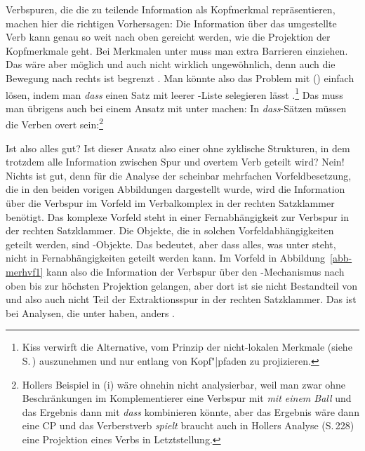 Verbspuren, die die zu teilende Information als Kopfmerkmal repräsentieren, machen hier die
richtigen Vorhersagen: Die Information über das umgestellte Verb kann genau so weit nach oben
gereicht werden, wie die Projektion der Kopfmerkmale geht. Bei Merkmalen unter \nonloc muss man
extra Barrieren einziehen. Das wäre aber möglich und auch nicht wirklich ungewöhnlich, denn auch die
Bewegung nach rechts ist begrenzt \citep[Abschnitt~5.1.2]{Ross67a}. Man könnte also das Problem mit () einfach lösen, indem
man \emph{dass} einen Satz mit leerer \dsl-Liste selegieren lässt \citep[232]{Kiss95b}.\footnote{
Kiss verwirft die Alternative, \dsl vom Prinzip der nicht-lokalen Merkmale (siehe S.\,\pageref{Prinzip-NONLOC}) auszunehmen und nur
entlang von Kopf"|pfaden zu projizieren.
} Das muss man übrigens auch bei
einem Ansatz mit \dsl unter \head machen: In \emph{dass}-Sätzen müssen die Verben overt
sein:\footnote{
Hollers Beispiel \citeyearpar[231]{Holler2005a-u} in (i) wäre ohnehin nicht analysierbar, weil
man zwar ohne Beschränkungen im Komplementierer eine Verbspur mit \emph{mit einem Ball} und das
Ergebnis dann mit \emph{dass} kombinieren könnte, aber das Ergebnis wäre dann eine CP und das
Verberstverb \emph{spielt} braucht auch in Hollers Analyse (S.\,228) eine Projektion eines Verbs in Letztstellung.
\z
}
\z

\noindent
Ist also alles gut? Ist dieser Ansatz also einer ohne zyklische Strukturen, in dem trotzdem alle
Information zwischen Spur und overtem Verb geteilt wird? Nein! Nichts ist gut, denn für die Analyse
der scheinbar mehrfachen Vorfeldbesetzung, die in den beiden vorigen Abbildungen dargestellt wurde,
wird die Information über die Verbspur im Vorfeld im Verbalkomplex in der rechten Satzklammer
benötigt. Das komplexe Vorfeld steht in einer Fernabhängigkeit zur Verbspur in der rechten
Satzklammer. Die Objekte, die in solchen Vorfeldabhängigkeiten geteilt werden, sind
-Objekte. Das bedeutet, aber dass alles, was unter \nonlocal steht, nicht in
Fernabhängigkeiten geteilt werden kann. Im Vorfeld in Abbildung~\ref{abb-merhvf1} kann also die
Information der Verbspur über den \nonlocal-Mechanismus nach oben bis zur höchsten Projektion
gelangen, aber dort ist sie nicht Bestandteil von \local {} und also auch nicht Teil der
Extraktionsspur in der rechten Satzklammer. Das ist bei Analysen, die \dsl unter \head haben,
anders \citep[Fn.\,21]{Mueller2002f}.


